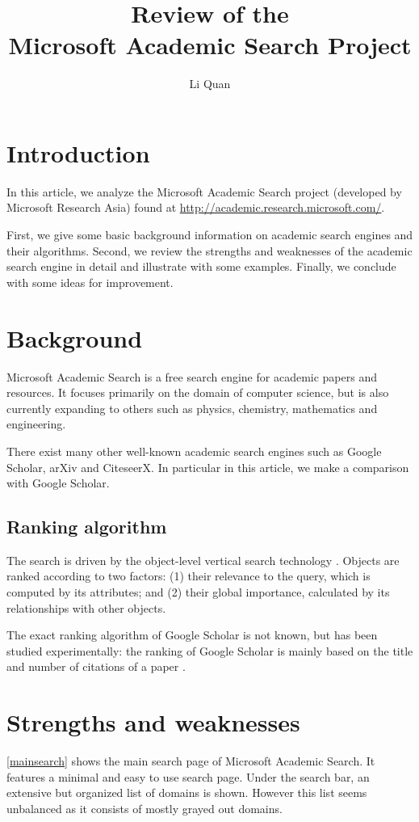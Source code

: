 \documentclass[a4paper,english,10pt]{scrartcl}
\title{Review of the\\ Microsoft Academic Search Project}
\author{Li Quan}
\begin{document}
\maketitle

%  

\section{Introduction}
In this article, we analyze the Microsoft Academic Search project (developed by Microsoft Research Asia) found at \url{http://academic.research.microsoft.com/}. 

First, we give some basic background information on academic search engines and their algorithms.
Second, we review the strengths and weaknesses of the academic search engine in detail and illustrate with some examples.
Finally, we conclude with some ideas for improvement.

\section{Background}
Microsoft Academic Search is a free search engine for academic papers and resources. It focuses primarily on the domain of computer science, but is also currently expanding to others such as physics, chemistry, mathematics and engineering. 

There exist many other well-known academic search engines such as Google Scholar, arXiv and CiteseerX. In particular in this article, we make a comparison with Google Scholar. 

\subsection{Ranking algorithm}
The search is driven by the object-level vertical search technology \cite{objectlevel}. Objects are ranked according to two factors: (1) their relevance to the query, which is computed by its attributes; and (2) their global importance, calculated by its relationships with other objects.

The exact ranking algorithm of Google Scholar is not known, but has been studied experimentally: the ranking of Google Scholar is mainly based on the title and number of citations of a paper \cite{googlescholarranking}.

\section{Strengths and weaknesses}
\autoref{mainsearch} shows the main search page of Microsoft Academic Search. It features a minimal and easy to use search page. Under the search bar, an extensive but organized list of domains is shown. However this list seems unbalanced as it consists of mostly grayed out domains.
\end{document}
